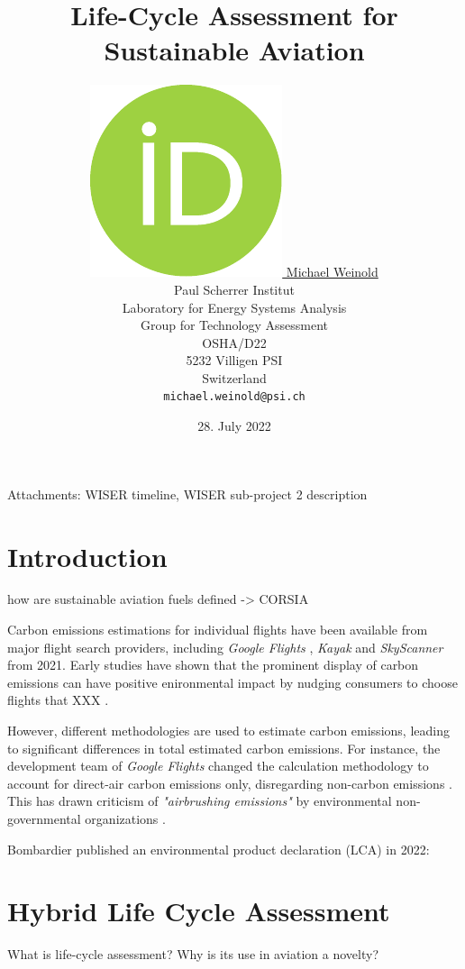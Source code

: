 \documentclass{article}
\title{Life-Cycle Assessment for Sustainable Aviation}
\author{
    \href{https://orcid.org/0000-0003-4859-2650}
    {\includegraphics[scale=0.06]{auxiliary/figures/orcid.pdf}
    \hspace{1mm}
    Michael Weinold} \\
	Paul Scherrer Institut\\
	Laboratory for Energy Systems Analysis\\
	Group for Technology Assessment\\
	OSHA/D22\\
    5232 Villigen PSI \\
    Switzerland \\
	\texttt{michael.weinold@psi.ch} \\
}
\date{28. July 2022}
\begin{document}


\maketitle

\begin{abstract}
	\cite{becattini_role_2021}
\end{abstract}

Attachments:
WISER timeline, WISER sub-project 2 description

\section{Introduction}

\cite{prussi_corsia_2021}

how are sustainable aviation fuels defined -> CORSIA \cite{prussi_corsia_2021}

    Carbon emissions estimations for individual flights have been available from major flight search providers, including \textit{Google Flights} \cite{holden_google_2021}, \textit{Kayak} \cite{noauthor_kayak_2021} and \textit{SkyScanner} \cite{crosthwaite_how_2021} from 2021. Early studies have shown that the prominent display of carbon emissions can have positive enironmental impact by nudging consumers to choose flights that XXX \cite{amenta_adding_2020}\cite{sanguinetti_nudging_2022}.
    
    However, different methodologies are used to estimate carbon emissions, leading to significant differences in total estimated carbon emissions. For instance, the development team of \textit{Google Flights} changed the calculation methodology to account for direct-air carbon emissions only, disregarding non-carbon emissions \cite{ali_commit_2022}. This has drawn criticism of \textit{"airbrushing emissions"} by environmental non-governmental organizations \cite{hern_google_2022}\cite{rowlatt_google_2022}.
    
    Bombardier published an environmental product declaration (LCA) in 2022: \cite{noauthor_challenger_2022}

\section{Hybrid Life Cycle Assessment}

	What is life-cycle assessment?
	Why is its use in aviation a novelty?
	
\end{document}
